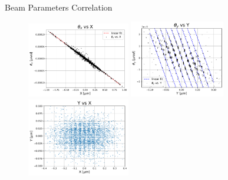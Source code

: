 \documentclass[9pt,a4paper]{beamer}
\begin{document}
\begin{frame}{Beam Parameters Correlation}

\begin{figure}
\includegraphics[width = 0.4\textwidth]{figures/X_Xp.pdf}
\includegraphics[width = 0.37\textwidth]{figures/Y_Yp.pdf} \\
\includegraphics[width = 0.4\textwidth]{figures/Y_X.pdf}
\end{figure}
\end{frame}
\end{document}
